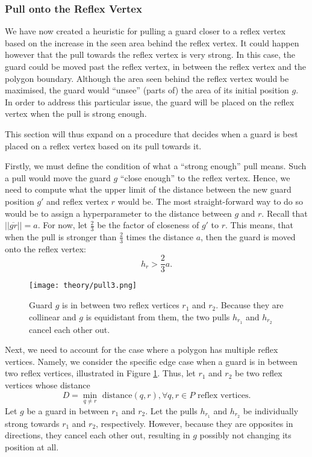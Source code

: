 \subsubsection{Pull onto the Reflex Vertex}
We have now created a heuristic for pulling a guard closer to a reflex vertex based on the increase in the seen area behind the reflex vertex. It could happen however that the pull towards the reflex vertex is very strong. In this case, the guard could be moved past the reflex vertex, in between the reflex vertex and the polygon boundary. Although the area seen behind the reflex vertex would be maximised, the guard would ``unsee'' (parts of) the area of its initial position $g$. In order to address this particular issue, the guard will be placed on the reflex vertex when the pull is strong enough. 

This section will thus expand on a procedure that decides when a guard is best placed on a reflex vertex based on its pull towards it.

Firstly, we must define the condition of what a ``strong enough'' pull means. Such a pull would move the guard $g$ ``close enough'' to the reflex vertex. Hence, we need to compute what the upper limit of the distance between the new guard position $g'$ and reflex vertex $r$ would be. The most straight-forward way to do so would be to assign a hyperparameter to the distance between $g$ and $r$. Recall that $||\overline{gr}|| = a$. For now, let $\frac 2 3$ be the factor of closeness of $g'$ to $r$. This means, that when the pull is stronger than $\frac 2 3$ times the distance $a$, then the guard is moved onto the reflex vertex: $$h_r > \frac 2 3 a.$$


\begin{figure}[h!]
    \centering
    \texttt{[image: theory/pull3.png]}
    \caption{Guard $g$ is in between two reflex vertices $r_1$ and $r_2$. Because they are collinear and $g$ is equidistant from them, the two pulls $h_{r_1}$ and $h_{r_2}$ cancel each other out.}
    \label{fig:pull_cancel}
\end{figure}

Next, we need to account for the case where a polygon has multiple reflex vertices. Namely, we consider the specific edge case when a guard is in between two reflex vertices, illustrated in Figure \ref{fig:pull_cancel}. Thus, let $r_1$ and $r_2$ be two reflex vertices whose distance $$D = \min_{q \neq r} \text{ distance}(q, r), \forall q, r \in P \text{ reflex vertices}.$$
Let $g$ be a guard in between $r_1$ and $r_2$. Let the pulls $h_{r_1}$ and $h_{r_2}$ be  individually strong towards $r_1$ and $r_2$, respectively. However, because they are opposites in directions, they cancel each other out, resulting in $g$ possibly not changing its position at all.

